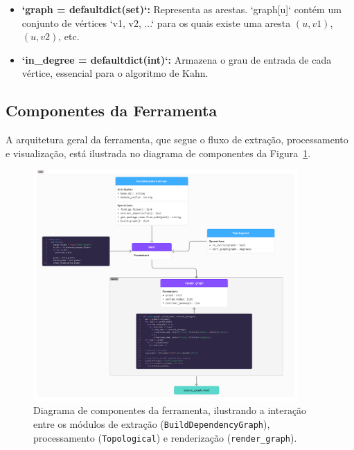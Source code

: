 \documentclass[12pt]{article}
\begin{document}
\begin{itemize}
    \item \textbf{`graph = defaultdict(set)`:} Representa as arestas. `graph[u]` contém um conjunto de vértices `{v1, v2, ...}` para os quais existe uma aresta $(u, v1)$, $(u, v2)$, etc.
    \item \textbf{`in\_degree = defaultdict(int)`:} Armazena o grau de entrada de cada vértice, essencial para o algoritmo de Kahn.
\end{itemize}

\subsection{Componentes da Ferramenta}

A arquitetura geral da ferramenta, que segue o fluxo de extração, processamento e visualização, está ilustrada no diagrama de componentes da Figura~\ref{fig:diagrama-classes}.

\begin{figure}[ht]
    \centering
    \includegraphics[width=0.9\textwidth]{images/diagrama_classes.png}
    \caption{Diagrama de componentes da ferramenta, ilustrando a interação entre os módulos de extração (\texttt{BuildDependencyGraph}), processamento (\texttt{Topological}) e renderização (\texttt{render\_graph}).}
    \label{fig:diagrama-classes}
\end{figure}
\end{document}
